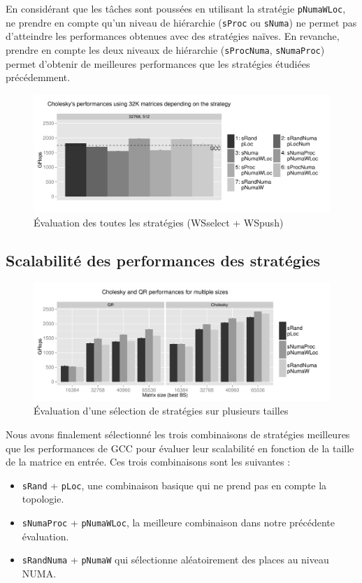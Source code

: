 \documentclass[parallelisme]{compas2016}
\begin{document}
En considérant que les tâches sont poussées en utilisant la stratégie \verb/pNumaWLoc/,
ne prendre en compte qu'un niveau de hiérarchie (\verb/sProc/ ou \verb/sNuma/) ne permet
pas d'atteindre les performances obtenues avec des stratégies naïves. En revanche,
prendre en compte les deux niveaux de hiérarchie (\verb/sProcNuma/, \verb/sNumaProc/)
permet d'obtenir de meilleures performances que les stratégies étudiées précédemment.

\begin{figure}[t]
  \centering
  \includegraphics[scale=0.5]{figures/graph_all_strat.pdf}
  \caption{Évaluation des toutes les stratégies (WSselect + WSpush)}
\label{fig:eval-all-strat}
\end{figure}

\subsection{Scalabilité des performances des stratégies}

\begin{figure}[t]
  \centering
  \includegraphics[scale=0.5]{figures/graph_details_strat.pdf}
\caption{Évaluation d'une sélection de stratégies sur plusieurs tailles}
\label{fig:eval-strat-sizes}
\end{figure}

Nous avons finalement sélectionné les trois combinaisons de stratégies meilleures
que les performances de GCC pour évaluer leur scalabilité en fonction de la taille
de la matrice en entrée. Ces trois combinaisons sont les suivantes :
\begin{itemize}
  \item \verb/sRand/ + \verb/pLoc/, une combinaison basique qui ne prend pas en compte la topologie.
  \item \verb/sNumaProc/ + \verb/pNumaWLoc/, la meilleure combinaison dans notre
    précédente évaluation.
  \item \verb/sRandNuma/ + \verb/pNumaW/ qui sélectionne aléatoirement
    des places au niveau NUMA.
\end{itemize}
\end{document}
